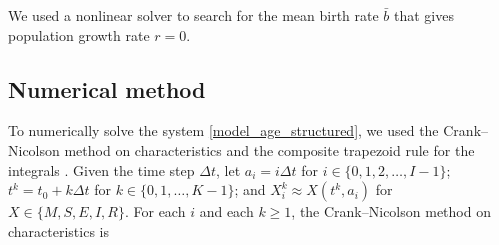 \documentclass{jpmarticle}
\begin{document}
We used a nonlinear solver to search for the mean birth rate $\bar{b}$
that gives population growth rate $r = 0$.


\subsection{Numerical method}

To numerically solve the system
\eqref{model_age_structured}, we used the Crank--Nicolson
method on characteristics and the composite trapezoid rule for the
integrals \autocite{milner_1992}.  Given the time step $\Delta t$,
let $a_i = i \Delta t$ for $i \in \{0, 1, 2, \ldots, I - 1\}$;
$t^k = t_0 + k \Delta t$ for $k \in \{0, 1, \ldots, K - 1\}$;
and $X_i^k \approx X(t^k, a_i)$ for $X \in \{M, S, E, I, R\}$.
For each $i$ and each $k \geq 1$, the Crank--Nicolson method on
characteristics is
\end{document}
